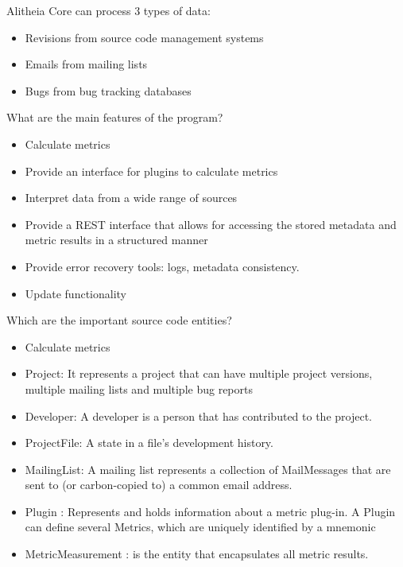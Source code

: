 \documentclass[a4paper,11pt,titlepage]{article}
\begin{document}
Alitheia Core can process 3 types of data:
\begin{itemize}
\item Revisions from source code management systems
\item Emails from mailing lists
\item Bugs from bug tracking databases
\end{itemize}

What are the main features of the program?
\begin{itemize}
\item Calculate metrics
\item Provide an interface for plugins to calculate metrics
\item Interpret data from a wide range of sources
\item Provide a REST interface that allows for accessing the stored metadata and metric results in a structured manner
\item Provide error recovery tools: logs, metadata consistency. %
\item Update functionality %
\end{itemize}

Which are the important source code entities?
\begin{itemize}
\item Calculate metrics %
\item Project: It represents a project that can have multiple project versions, multiple mailing lists and multiple bug reports

\item Developer: A developer is a person that has contributed to the project.

\item ProjectFile: A state in a file's development history.

\item MailingList: A mailing list represents a collection of MailMessages that are sent to (or carbon-copied to) a common email address.

\item Plugin : Represents and holds information about a metric plug-in. A Plugin can define several Metrics, which are uniquely identified by a mnemonic

\item MetricMeasurement : is the entity that encapsulates all metric results.
\end{itemize}
\end{document}
